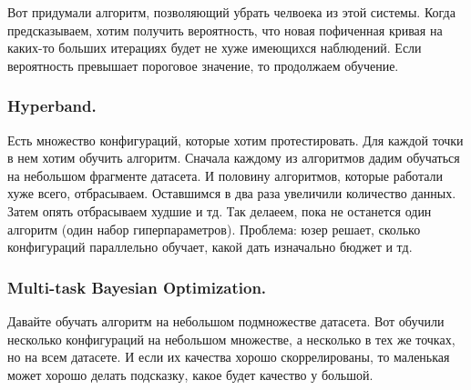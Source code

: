 \documentclass[12pt]{article}
\begin{document}
Вот придумали алгоритм, позволяющий убрать челвоека из этой системы. Когда предсказываем, хотим получить вероятность, что новая пофиченная кривая на каких-то больших итерациях будет не хуже имеющихся наблюдений. Если вероятность превышает пороговое значение, то продолжаем обучение. 
    
\subsubsection{Hyperband.}
Есть множество конфигураций, которые хотим протестировать. Для каждой точки в нем хотим обучить алгоритм. Сначала каждому из алгоритмов дадим обучаться на небольшом фрагменте датасета. И половину алгоритмов, которые работали хуже всего, отбрасываем. Оставшимся в два раза увеличили количество данных. Затем опять отбрасываем худшие и тд. Так делаеем, пока не останется один алгоритм (один набор гиперпараметров). Проблема: юзер решает, сколько конфигураций параллельно обучает, какой дать изначально бюджет и тд.
    
\subsubsection{Multi-task Bayesian Optimization.}
Давайте обучать алгоритм на небольшом подмножестве датасета. Вот обучили несколько конфигураций на небольшом множестве, а несколько в тех же точках, но на всем датасете. И если их качества хорошо скоррелированы, то маленькая может хорошо делать подсказку, какое будет качество у большой. 
\end{document}

